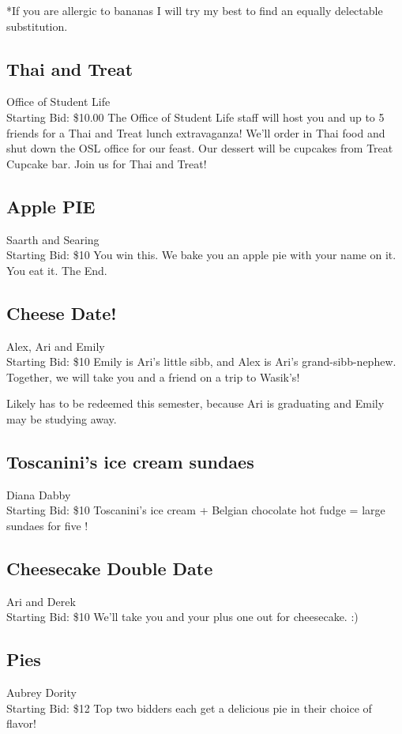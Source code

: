 \documentclass[11pt]{article}
\begin{document}
*If you are allergic to bananas I will try my best to find an equally delectable substitution.
\subsection{Thai and Treat}
Office of Student Life
\\
Starting Bid: \$10.00
\newline
The Office of Student Life staff will host you and up to 5 friends for a Thai and Treat lunch extravaganza!  We'll order in Thai food and shut down the OSL office for our feast.  Our dessert will be cupcakes from Treat Cupcake bar.  Join us for Thai and Treat!
\subsection{Apple PIE}
Saarth and Searing
\\
Starting Bid: \$10
\newline
You win this. We bake you an apple pie with your name on it. You eat it. The End.
\subsection{Cheese Date!}
Alex, Ari and Emily
\\
Starting Bid: \$10
\newline
Emily is Ari's little sibb, and Alex is Ari's grand-sibb-nephew. Together, we will take you and a friend on a trip to Wasik's!

Likely has to be redeemed this semester, because Ari is graduating and Emily may be studying away.
\subsection{Toscanini's ice cream sundaes}
Diana Dabby
\\
Starting Bid: \$10
\newline
Toscanini's ice cream + Belgian chocolate hot fudge = large sundaes for five !
\subsection{Cheesecake Double Date}
Ari and Derek
\\
Starting Bid: \$10
\newline
We'll take you and your plus one out for cheesecake. :)
\subsection{Pies}
Aubrey Dority
\\
Starting Bid: \$12
\newline
Top two bidders each get a delicious pie in their choice of flavor!
\end{document}
